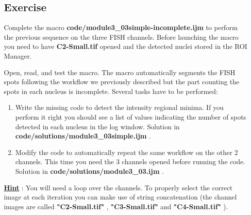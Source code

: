 \subsection{Exercise }
Complete the macro \textbf{code/module3\_03simple-incomplete.ijm} to perform the previous sequence on the three FISH channels. Before launching the macro you need to have \textbf{C2-Small.tif} opened and the detected nuclei stored in the ROI Manager.

Open, read, and test the macro. The macro automatically segments the FISH spots following the workflow we previously described but the part counting the spots in each nucleus is incomplete. Several tasks have to be performed:

\begin{enumerate}

\item Write the missing code to detect the intensity regional minima. If you perform it right you should see a list of values indicating the number of spots detected in each nucleus in the log window. Solution in \textbf{code/solutions/module3\_03simple.ijm} .

\item Modify the code to automatically repeat the same workflow on the other 2 channels. This time you need the 3 channels opened before running the code. Solution in \textbf{code/solutions/module3\_03.ijm} .

\end{enumerate}

\textbf{\underline{Hint}} : You will need a loop over the channels. To properly select the correct image at each iteration you can make use of string concatenation (the channel images are called \textbf{"C2-Small.tif"} , \textbf{"C3-Small.tif"} and \textbf{"C4-Small.tif"} ).